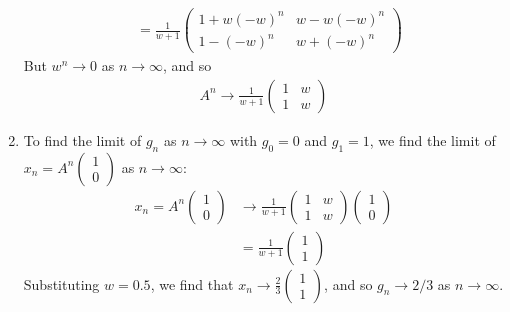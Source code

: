 \documentclass[11pt]{article}
\begin{document}
\begin{enumerate}
\begin{align}
&=  \frac{1}{w+1} \begin{pmatrix} 1+w(-w)^n & w-w(-w)^n \\ 1-(-w)^n & w+(-w)^n \end{pmatrix}
\end{align}
But $w^n \to 0$ as $n\to \infty$, and so 
\begin{align}
A^n \to \frac{1}{w+1} \begin{pmatrix} 1 & w \\ 1 & w \end{pmatrix}
\end{align}

\item To find the limit of $g_n$ as $n\to\infty$ with $g_0 = 0$ and $g_1 = 1$, we find the limit of $x_n = A^n\begin{pmatrix} 1 \\ 0 \end{pmatrix}$ as $n\to \infty$:
\begin{align}
x_n = A^n \begin{pmatrix} 1 \\ 0 \end{pmatrix} &\to \frac{1}{w+1} \begin{pmatrix} 1 & w \\ 1 & w \end{pmatrix} \begin{pmatrix} 1 \\ 0 \end{pmatrix}\\
&= \frac{1}{w+1} \begin{pmatrix} 1 \\ 1 \end{pmatrix}
\end{align}
Substituting $w=0.5$, we find that $x_n \to \frac{2}{3} \begin{pmatrix} 1 \\ 1 \end{pmatrix}$, and so $g_n\to 2/3$ as $n\to\infty$. 
\end{enumerate}
\end{document}

